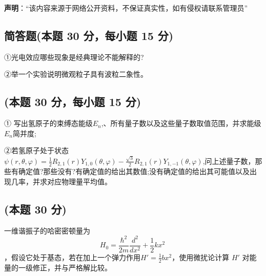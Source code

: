 
\textbf{声明}：“该内容来源于网络公开资料，不保证真实性，如有侵权请联系管理员”

\subsection{简答题(本题 30 分，每小题 15 分)}
①光电效应哪些现象是经典理论不能解释的?

②举一个实验说明微观粒子具有波粒二象性。

\subsection{(本题 30 分，每小题 15 分)}
① 写出氢原子的束缚态能级$E_n$,、所有量子数以及这些量子数取值范围，并求能级$E_n$简并度;

②若氢原子处于状态$\psi(r, \theta, \varphi) = \frac{1}{2} R_{2,1}(r) Y_{1,0}(\theta, \varphi) - \frac{\sqrt{3}}{2} R_{2,1}(r) Y_{1,-1}(\theta, \varphi)$,问上述量子数，那些有确定值?那些没有?有确定值的给出其数值;没有确定值的给出其可能值以及出现几率，并求对应物理量平均值。

\subsection{(本题 30 分)}
一维谐振子的哈密密顿量为 $$ H_0 = \frac{\hbar^2}{2m} \frac{d^2}{dx^2} + \frac{1}{2} k x^2~$$，假设它处于基态，若在加上一个弹力作用$H' = \frac{1}{2} b x^2$，使用微扰论计算 $H'$ 对能量的一级修正，并与严格解比较。
